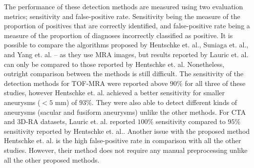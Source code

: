 The performance of these detection methods are measured using two evaluation metrics; sensitivity and false-positive rate. Sensitivity being the measure of the proportion of positives that are correctly identified, and false-positive rate being a measure of the proportion of diagnoses incorrectly classified as positive. It is possible to compare the algorithms proposed by Hentschke et. al., Suniaga et. al., and Yang et. al. -- as they use MRA images, but results reported by Lauric et. al. can only be compared to those reported by Hentschke et. al. Nonetheless, outright comparison between the methods is still difficult. The sensitivity of the detection methods for TOF-MRA were reported above $90\%$ for all three of these studies, however Hentschke et. al. achieved a better sensitivity for smaller aneurysms ($< 5$ mm) of $93\%$. They were also able to detect different kinds of aneurysms (sacular and fusiform aneurysms) unlike the other methods. For CTA and 3D-RA datasets, Lauric et. al. reported $100\%$ sensitivity compared to $95\%$ sensitivity reported by Hentschke et. al.. Another issue with the proposed method Hentschke et. al. is the high false-positive rate in comparison with all the other studies. However, their method does not require any manual preprocessing unlike all the other proposed methods.

